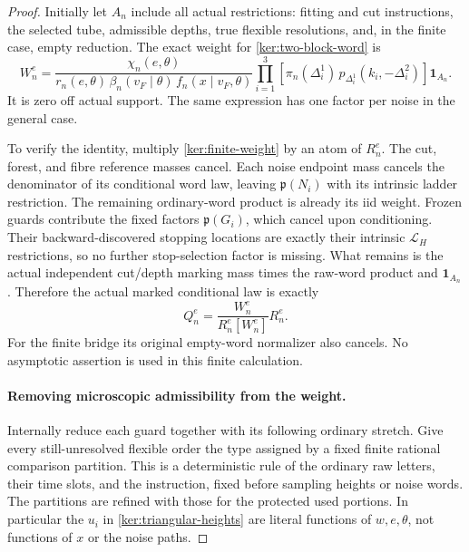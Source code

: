 \documentclass[11pt]{article}
\numberwithin{equation}{section}
\theoremstyle{definition}
\theoremstyle{remark}
\newcommand{\1}{\mathbf 1}
\begin{document}
\begin{proof}
Initially let \(A_n\) include all actual restrictions: fitting and
cut instructions, the selected tube, admissible depths, true flexible
resolutions, and, in the finite case, empty reduction.  The exact
weight for \eqref{ker:two-block-word} is
\begin{equation}\label{ker:finite-weight}
 W_n^e=
 \frac{\chi_n(e,\theta)}
 {r_n(e,\theta)\,\beta_n(v_F\mid\theta)\,
                         f_n(x\mid v_F,\theta)}
 \prod_{i=1}^{3}\!\left[
   \pi_n(\Delta_i^1)\,
   p_{\Delta_i^1}(k_i,-\Delta_i^2)\right]\1_{A_n}.
\end{equation}
It is zero off actual support.  The same expression has one factor
per noise in the general case.

To verify the identity, multiply \eqref{ker:finite-weight} by an
atom of \(R_n^e\).  The cut, forest, and fibre reference masses cancel.
Each noise endpoint mass cancels the denominator of its conditional
word law, leaving \(\mathfrak p(N_i)\) with its intrinsic ladder
restriction.  The remaining ordinary-word product is already its
iid weight.  Frozen guards contribute the fixed factors
\(\mathfrak p(G_i)\), which cancel upon conditioning.  Their
backward-discovered stopping locations are exactly their intrinsic
\(\mathcal L_H\) restrictions, so no further stop-selection factor
is missing.  What remains is the actual independent cut/depth marking
mass times the raw-word product and \(\1_{A_n}\).
Therefore the actual marked conditional law is exactly
\[
 Q_n^e=\frac{W_n^e}{R_n^e[W_n^e]}R_n^e.
\]
For the finite bridge its original empty-word normalizer also cancels.
No asymptotic assertion is used in this finite calculation.

\paragraph{Removing microscopic admissibility from the weight.}
Internally reduce each guard together with its following ordinary
stretch.  Give every still-unresolved flexible order the type assigned
by a fixed finite rational comparison partition.  This is a
deterministic rule of the ordinary raw letters, their time slots,
and the instruction, fixed before sampling heights or noise words.
The partitions are refined with those for the protected used portions.
In particular the \(u_i\) in \eqref{ker:triangular-heights} are literal
functions of \(w,e,\theta\), not functions of \(x\) or the noise paths.


\end{proof}
\end{document}
